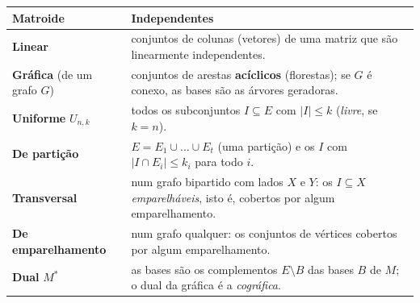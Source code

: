 \begin{exemplo}
\begin{figura}
\hspace{5mm}
\end{figura}
\end{exemplo}

\begin{center}\small
\begin{tabularx}{\linewidth}{@{}lX@{}}
\toprule
Matroide & Independentes\\
\midrule
\textbf{Linear} & conjuntos de colunas (vetores) de uma matriz que são linearmente independentes.\\
\textbf{Gráfica} (de um grafo $G$) & conjuntos de arestas \textbf{acíclicos} (florestas); se $G$ é conexo, as bases são as árvores geradoras.\\
\textbf{Uniforme}\index{matroide!uniforme} $U_{n,k}$ & todos os subconjuntos $I\subseteq E$ com $|I|\le k$ (\emph{livre}, se $k=n$).\\
\textbf{De partição}\index{matroide!de particao@de partição} & $E=E_1\cup\dots\cup E_t$ (uma partição) e os $I$ com $|I\cap E_i|\le k_i$ para todo $i$.\\
\textbf{Transversal}\index{matroide!transversal} & num grafo bipartido com lados $X$ e $Y$: os $I\subseteq X$ \emph{emparelháveis}, isto é, cobertos por algum emparelhamento.\\
\textbf{De emparelhamento} & num grafo qualquer: os conjuntos de vértices cobertos por algum emparelhamento.\\
\textbf{Dual}\index{matroide!dual} $M^*$ & as bases são os complementos $E\setminus B$ das bases $B$ de $M$; o dual da gráfica é a \emph{cográfica}.\\
\bottomrule
\end{tabularx}
\end{center}

